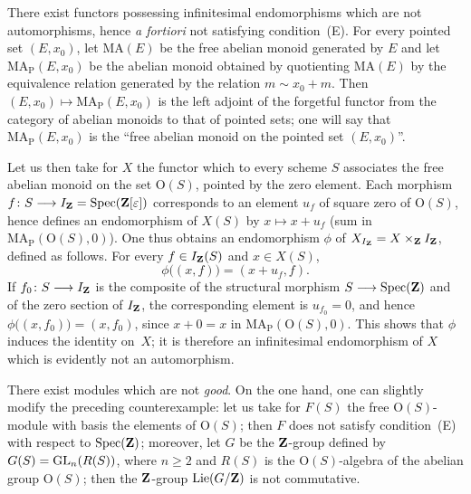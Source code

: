 \label{II.6.2}
There exist functors possessing infinitesimal endomorphisms which are not
automorphisms, hence \emph{a fortiori} not satisfying
condition~(E).%
{\renewcommand{\thefootnote}{(100)}}
For every pointed set \((E,x_0)\), let \(\mathrm{MA}(E)\) be the free
abelian monoid generated by \(E\) and let \(\mathrm{MA}_{\mathrm{P}}(E,x_0)\)
be the abelian monoid obtained by quotienting \(\mathrm{MA}(E)\) by the
equivalence relation generated by the relation \(m\sim x_0+m\). Then
\((E,x_0)\mapsto\mathrm{MA}_{\mathrm{P}}(E,x_0)\) is the left adjoint of the
forgetful functor from the category of abelian monoids to that of pointed
sets; one will say that \(\mathrm{MA}_{\mathrm{P}}(E,x_0)\) is the ``free
abelian monoid on the pointed set \((E,x_0)\)''.

Let us then take for \(X\) the functor which to every scheme \(S\)
associates the free abelian monoid on the set \(\mathrm{O}(S)\), pointed
by the zero element. Each morphism
\(f\colon S\longrightarrow I_{\mathbf{Z}}=\operatorname{Spec}(\mathbf{Z}[\varepsilon])\) corresponds to an element
\(u_f\) of square zero of \(\mathrm{O}(S)\), hence defines an endomorphism
of \(X(S)\) by \(x\mapsto x+u_f\) (sum in
\(\mathrm{MA}_{\mathrm{P}}(\mathrm{O}(S),0)\)). One thus obtains an
endomorphism \(\phi\) of \(X_{I_{\mathbf{Z}}}=X\times_{\mathbf{Z}}I_{\mathbf{Z}}\), defined as
follows. For every \(f\in I_{\mathbf{Z}}(S)\) and \(x\in X(S)\),
\[
\phi\bigl((x,f)\bigr)=(x+u_f,f).
\]
If \(f_0\colon S\longrightarrow I_{\mathbf{Z}}\) is the composite of the structural morphism
\(S\longrightarrow\operatorname{Spec}(\mathbf{Z})\) and of the zero section of \(I_{\mathbf{Z}}\), the corresponding
element is \(u_{f_0}=0\), and hence
\(\phi\bigl((x,f_0)\bigr)=(x,f_0)\), since \(x+0=x\) in
\(\mathrm{MA}_{\mathrm{P}}(\mathrm{O}(S),0)\). This shows that \(\phi\)
induces the identity on~\(X\); it is therefore an infinitesimal
endomorphism of \(X\) which is evidently not an automorphism.

\label{II.6.3}
There exist modules which are not \emph{good}. On the one hand, one can
slightly modify the preceding counterexample:%
{\renewcommand{\thefootnote}{(101)}}
let us take for \(F(S)\) the free \(\mathrm{O}(S)\)-module with basis the
elements of \(\mathrm{O}(S)\); then \(F\) does not satisfy condition~(E)
with respect to \(\operatorname{Spec}(\mathbf{Z})\); moreover, let \(G\) be the \(\mathbf{Z}\)-group
defined by \(G(S)=\operatorname{GL}_n(R(S))\), where \(n\geqslant 2\) and \(R(S)\) is
the \(\mathrm{O}(S)\)-algebra of the abelian group \(\mathrm{O}(S)\); then
the \(\mathbf{Z}\)-group \(\operatorname{Lie}(G/\mathbf{Z})\) is not commutative.

